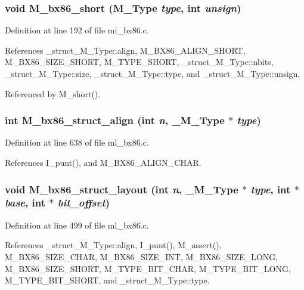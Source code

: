 \subsubsection{\setlength{\rightskip}{0pt plus 5cm}void M\_\-bx86\_\-short (\bf{M\_\-Type} {\em type}, int {\em unsign})}\label{m__bx86_8h_d893007e4234cdc2a154a7019e66b3a4}




Definition at line 192 of file mi\_\-bx86.c.

References \_\-struct\_\-M\_\-Type::align, M\_\-BX86\_\-ALIGN\_\-SHORT, M\_\-BX86\_\-SIZE\_\-SHORT, M\_\-TYPE\_\-SHORT, \_\-struct\_\-M\_\-Type::nbits, \_\-struct\_\-M\_\-Type::size, \_\-struct\_\-M\_\-Type::type, and \_\-struct\_\-M\_\-Type::unsign.

Referenced by M\_\-short().
\subsubsection{\setlength{\rightskip}{0pt plus 5cm}int M\_\-bx86\_\-struct\_\-align (int {\em n}, \bf{\_\-M\_\-Type} $\ast$ {\em type})}\label{m__bx86_8h_317a57d7158d6594ec256c6fc738bdca}




Definition at line 638 of file ml\_\-bx86.c.

References I\_\-punt(), and M\_\-BX86\_\-ALIGN\_\-CHAR.
\subsubsection{\setlength{\rightskip}{0pt plus 5cm}void M\_\-bx86\_\-struct\_\-layout (int {\em n}, \bf{\_\-M\_\-Type} $\ast$ {\em type}, int $\ast$ {\em base}, int $\ast$ {\em bit\_\-offset})}\label{m__bx86_8h_dde1201ea767874e04bed2cd5d876c9c}




Definition at line 499 of file ml\_\-bx86.c.

References \_\-struct\_\-M\_\-Type::align, I\_\-punt(), M\_\-assert(), M\_\-BX86\_\-SIZE\_\-CHAR, M\_\-BX86\_\-SIZE\_\-INT, M\_\-BX86\_\-SIZE\_\-LONG, M\_\-BX86\_\-SIZE\_\-SHORT, M\_\-TYPE\_\-BIT\_\-CHAR, M\_\-TYPE\_\-BIT\_\-LONG, M\_\-TYPE\_\-BIT\_\-SHORT, and \_\-struct\_\-M\_\-Type::type.
